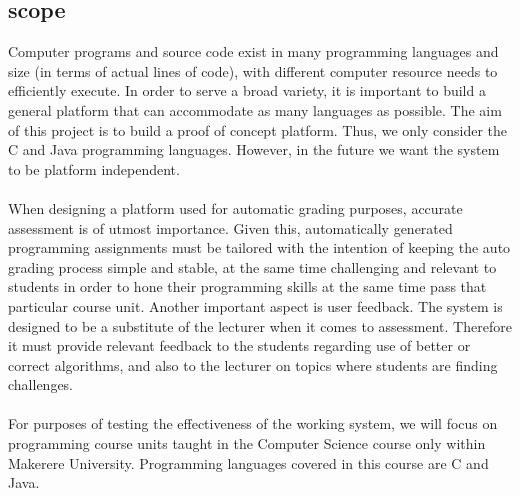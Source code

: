 \documentclass[12pt]{article}
\begin{document}
	\subsection{scope}
		Computer programs and source code exist in many programming languages and size (in
		terms of actual lines of code), with different computer resource needs to efficiently execute.
		In order to serve a broad variety, it is important to build a general platform that can
		accommodate as many languages as possible. The aim of this project is to build a proof of
		concept platform. Thus, we only consider the C and Java programming languages.
		However, in the future we want the system to be platform independent. \\ \\
			When designing a platform used for automatic grading purposes, accurate assessment is of
		utmost importance. Given this, automatically generated programming assignments must be
		tailored with the intention of keeping the auto grading process simple and stable, at the
		same time challenging and relevant to students in order to hone their programming skills
		at the same time pass that particular course unit. Another important aspect is user feedback.
		The system is designed to be a substitute of the lecturer when it comes to assessment.
		Therefore it must provide relevant feedback to the students regarding use of better or
		correct algorithms, and also to the lecturer on topics where students are finding challenges.\\ \\
			For purposes of testing the effectiveness of the working system, we will focus on
		programming course units taught in the Computer Science course only within Makerere
		University. Programming languages covered in this course are C and Java.
\end{document}
